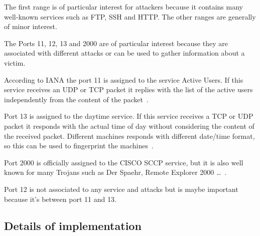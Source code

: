 The first range is of particular interest for attackers because it contains many well-known services such as FTP, SSH and HTTP.
The other ranges are generally of minor interest.

The Ports 11, 12, 13 and 2000 are of particular interest because they are associated with different attacks or can be used
to gather information about a victim.

According to IANA the port 11 is assigned to the service Active Users. If this service
receives an UDP or TCP packet it replies with the list of the active users independently from the content of the packet~\cite{systat}.

Port 13 is assigned to the daytime service. If this service receives a TCP or UDP packet it responds with the actual time of day without considering
the content of the received packet. Different machines responds with different date/time format, so this can be used to fingerprint the machines~\cite{portDetails}.

Port 2000 is officially assigned to the CISCO SCCP service, but it is also well known for 
many Trojans such as Der Spaehr, Remote Explorer 2000 \dots~\cite{portDetails}.

Port 12 is not associated to any service and attacks but is maybe important because it's between port 11 and 13.



\subsection{Details of implementation} 
